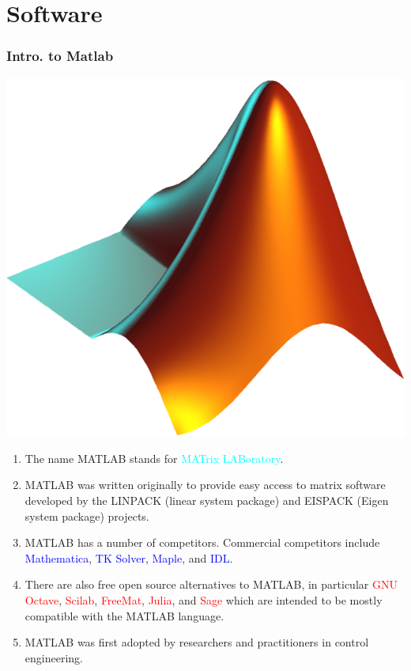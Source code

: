 \documentclass[hyperref={pdfpagelabels=true}]{beamer}
\begin{document}
\section{Software}
\begin{frame}
\frametitle{Intro. to Matlab}
\begin{flushright}
\includegraphics[scale = 0.08]{figs/Selection_035.png}
\end{flushright}
\begin{enumerate}
\item<1-> The name MATLAB stands for \textcolor{cyan}{MATrix LABoratory}. 
\item<2-> MATLAB was written originally to provide easy access to matrix software developed by the LINPACK (linear system package) and EISPACK (Eigen system package) projects.
\item<3-> MATLAB has a number of competitors. Commercial competitors include \textcolor{blue}{Mathematica}, \textcolor{blue}{ TK Solver}, \textcolor{blue}{Maple}, and  \textcolor{blue}{IDL}.
\item<4-> There are also free open source alternatives to MATLAB, in particular  \textcolor{red}{GNU Octave}, \textcolor{red}{Scilab}, \textcolor{red}{FreeMat}, \textcolor{red}{Julia}, and \textcolor{red}{Sage} which are intended to be mostly compatible with the MATLAB language.
\item<5-> MATLAB was first adopted by researchers and practitioners in control engineering.
\end{enumerate}
\end{frame}
\end{document}
